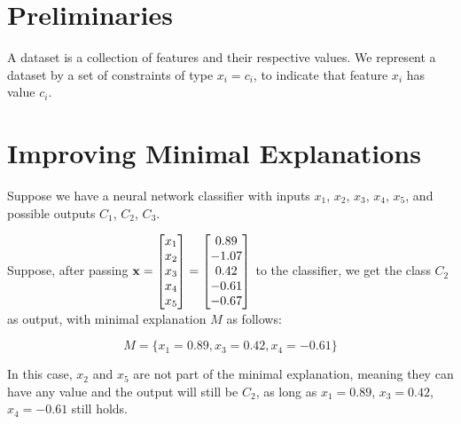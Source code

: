 \documentclass[12pt]{article}
\begin{document}
\section{Preliminaries}



A dataset is a collection of features and their respective values.
We represent a dataset by a set of constraints of type $x_i = c_i$, to indicate that feature $x_i$ has value $c_i$.



\section{Improving Minimal Explanations}



Suppose we have a neural network classifier with inputs $x_1$, $x_2$, $x_3$, $x_4$, $x_5$, and possible outputs $C_1$, $C_2$, $C_3$.

Suppose, after passing $\vb{x} = \begin{bmatrix} x_1 \\ x_2 \\ x_3 \\ x_4 \\ x_5 \end{bmatrix} = \begin{bmatrix} 0.89 \\ -1.07 \\ 0.42 \\ -0.61 \\ -0.67 \end{bmatrix}$ to the classifier, we get the class $C_2$ as output, with minimal explanation $M$ as follows:

\[
M = \{x_1 = 0.89, x_3 = 0.42, x_4 = -0.61\}
\]

In this case, $x_2$ and $x_5$ are not part of the minimal explanation, meaning they can have any value and the output will still be $C_2$, as long as $x_1 = 0.89$, $x_3 = 0.42$, $x_4 = -0.61$ still holds.
\end{document}
